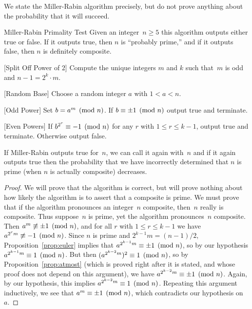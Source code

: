 We state the Miller-Rabin algorithm precisely, but do
not prove anything about the probability that it will
succeed.
\begin{algorithm}{Miller-Rabin Primality Test}\label{alg:miller_rabin}
Given an integer~$n\geq 5$ this algorithm
outputs either true or false.  If it outputs
true, then $n$ is ``probably prime,'' and if
it outputs false, then $n$ is definitely composite.
\begin{steps}
\item{}[Split Off Power of $2$]
Compute the unique integers $m$ and $k$ such that~$m$ is
odd  and $n-1=2^k \cdot m $.
\item{}[Random Base] Choose a random integer $a$ with $1<a<n$.
\item{}[Odd Power] Set $b= a^m\pmod{n}$.
If $b\equiv \pm 1\pmod{n}$
output true and terminate.
\item{}[Even Powers] If $b^{2^r}\equiv -1 \pmod{n}$ for any
$r$ with $1\leq r\leq k-1$, output true and terminate.
Otherwise output false.
\end{steps}
\end{algorithm}
If Miller-Rabin outputs true for~$n$, we can call it again
with~$n$ and if it again outputs true then the probability
that we have incorrectly determined that $n$ is prime (when
$n$ is actually composite) decreases.
\begin{proof}
  We will prove that the algorithm is correct, but will prove nothing
  about how likely the algorithm is to assert that a composite is
  prime.  We must prove that if the algorithm pronounces an
  integer~$n$ composite, then~$n$ really is composite.  Thus
  suppose~$n$ is prime, yet the algorithm pronounces~$n$ composite.
  Then $a^m\not\equiv \pm 1\pmod{n}$, and for all $r$ with $1\leq r\leq
  k-1$ we have $a^{2^r m} \not \equiv -1\pmod{n}$.  Since $n$ is prime
  and $2^{k-1}m = (n-1)/2$, Proposition~\ref{prop:euler} implies that
  $a^{2^{k-1}m}\equiv \pm 1\pmod{n}$, so by our hypothesis
  $a^{2^{k-1}m}\equiv 1\pmod{n}$.  But then $(a^{2^{k-2}m})^2 \equiv
  1\pmod{n}$, so by Proposition~\ref{prop:atmost} (which is proved
  right after it is stated, and whose proof does not depend on this
  argument), we have $a^{2^{k-2}m}\equiv \pm 1\pmod{n}$.  Again, by our
  hypothesis, this implies $a^{2^{k-2}m}\equiv 1\pmod{n}$.  Repeating
  this argument inductively, we see that $a^m\equiv \pm 1\pmod{n}$, which
  contradicts our hypothesis on~$a$.
\end{proof}


